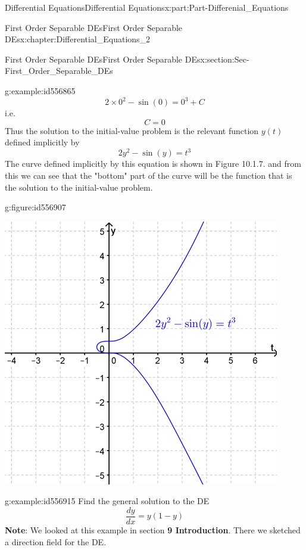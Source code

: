 \documentclass[oneside,10pt,]{book}
\newcommand{\terminology}[1]{\textbf{#1}}
\numberwithin{equation}{section}
\begin{document}
\begin{partptx}{Differential Equations}{}{Differential Equations}{}{}{x:part:Part-Differenial_Equations}
\begin{chapterptx}{First Order Separable DEs}{}{First Order Separable DEs}{}{}{x:chapter:Differential_Equations_2}
\begin{sectionptx}{First Order Separable DEs}{}{First Order Separable DEs}{}{}{x:section:Sec-First_Order_Separable_DEs}
\begin{example}{}{g:example:id556865}
\begin{equation*}
2\times 0^2-\sin(0)=0^3+C
\end{equation*}
i.e.%
\begin{equation*}
C=0
\end{equation*}
Thus the solution to the initial-value problem is the relevant function \(y(t)\) defined implicitly by%
\begin{equation*}
2y^2-\sin(y)=t^3
\end{equation*}
The curve defined implicitly by this equation is shown in Figure 10.1.7. and from this we can see that the "bottom" part of the curve will be the function that is the solution to the initial-value problem. \begin{figureptx}{}{g:figure:id556907}{}%
\begin{image}{0.125}{0.75}{0.125}%
\includegraphics[width=\linewidth]{./DifferentialEquations/Images/2/1_example4.png}
\end{image}%
\tcblower
\end{figureptx}%
%
\end{example}
\begin{example}{}{g:example:id556915}%
Find the general solution to the DE%
\begin{equation*}
\frac{dy}{dx}=y(1-y)
\end{equation*}
\terminology{Note}: We looked at this example in section \terminology{9 Introduction}. There we sketched a direction field for the DE.%

\end{example}
\end{sectionptx}
\end{chapterptx}
\end{partptx}
\end{document}
